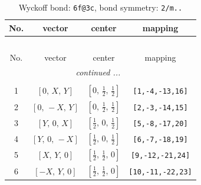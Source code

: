 \documentclass[fleqn,8pt]{jsarticle}
\begin{document}
\begin{longtable}{cccc}
\caption{Wyckoff bond: {\tt 6f@3c}, bond symmetry: {\tt 2/m..}}
 \\
 \hline \hline
No. & vector & center & mapping \\ \hline \endfirsthead

\multicolumn{3}{l}{\tablename\ \thetable{}} \\
 \hline \hline
No. & vector & center & mapping \\ \hline \endhead

 \hline \hline
\multicolumn{3}{r}{\footnotesize\it continued ...} \\ \endfoot

 \hline \hline
\multicolumn{3}{r}{} \\ \endlastfoot

1 & $\left[ 0,\, X,\, Y \right]$ & $\left[ 0,\, \frac{1}{2},\, \frac{1}{2} \right]$ & {\tt [1,-4,-13,16]} \\ \hline
2 & $\left[ 0,\, - X,\, Y \right]$ & $\left[ 0,\, \frac{1}{2},\, \frac{1}{2} \right]$ & {\tt [2,-3,-14,15]} \\ \hline
3 & $\left[ Y,\, 0,\, X \right]$ & $\left[ \frac{1}{2},\, 0,\, \frac{1}{2} \right]$ & {\tt [5,-8,-17,20]} \\ \hline
4 & $\left[ Y,\, 0,\, - X \right]$ & $\left[ \frac{1}{2},\, 0,\, \frac{1}{2} \right]$ & {\tt [6,-7,-18,19]} \\ \hline
5 & $\left[ X,\, Y,\, 0 \right]$ & $\left[ \frac{1}{2},\, \frac{1}{2},\, 0 \right]$ & {\tt [9,-12,-21,24]} \\ \hline
6 & $\left[ - X,\, Y,\, 0 \right]$ & $\left[ \frac{1}{2},\, \frac{1}{2},\, 0 \right]$ & {\tt [10,-11,-22,23]} \\
\end{longtable}
\renewcommand{\arraystretch}{1.2}
\end{document}
